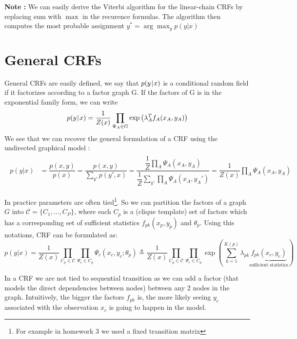 \documentclass[a4paper, 11pt]{article}
\newenvironment{note}
{\begin{framed} \textbf{Note :}}
{\end{framed}}
\newcommand{\pcond}[2]{p(#1 \hspace{-.2em}\mid\hspace{-.2em} #2)}
\begin{document}
\begin{note}
  We can easily derive the Viterbi algorithm for the linear-chain CRFs
  by replacing sum with $\max$ in the recurence formulas. The
  algorithm then computes the most probable assignment
  $y^* = \arg \max_{y} p(y|x)$
\end{note}

\section{General CRFs}

General CRFs are easily defined, we say that $\pcond{y}{x}$ is a
conditional random field if it factorizes according to a factor graph
G. If the factors of G is in the exponential family form, we can write
\begin{equation}
  \pcond{y}{x} = \dfrac{1}{Z(x)} \prod_{\Psi_A \in G} \exp{
    \left(
      \lambda_A^T f_A(x_A, y_A)
    \right)}
\end{equation}
We see that we can recover the general formulation of a CRF using the
undirected graphical model :
\begin{align}
\begin{split}
    p(y|x) &= \dfrac{p(x,y)}{p(x)}
    = \dfrac{p(x,y)}{\sum_{y'} p(y', x)}
    = \dfrac{\dfrac{1}{Z}\prod_{A}\Psi_A(x_A, y_A)}{\dfrac{1}{Z} \sum_{y'} \prod_{A} \Psi_A(x_A, y_A')}
    = \dfrac{1}{Z(x)}\prod\limits_{A} \Psi_A(x_A, y_A)
\end{split}
\end{align}

In practice parameters are often tied\footnote{For example in
  homework 3 we used a fixed transition matrix}. So we can
partition the factors of a graph $G$ into
$\mathcal{C} = \{C_1, \hdots, C_P\}$, where each $C_p$ is a (clique
template) set of factors which has a corresponding set of sufficient
statistics $f_{pk}(x_p, y_p)$ and $\theta_p$. Using this notations,
CRF can be formulated as:
\begin{equation}
    p(y|x) = \dfrac{1}{Z(x)}\prod\limits_{C_p \in \mathcal{C}} \prod\limits_{\Psi_c \in C_p} \Psi_c(x_c, y_c; \theta_p) \triangleq \dfrac{1}{Z(x)} \prod\limits_{C_p \in \mathcal{C}} \prod\limits_{\Psi_c \in C_p}
    \exp\left(\sum\limits_{k=1}^{K(p)} \lambda_{pk} \underbrace{f_{pk}(x_c, y_c)}_{\text{sufficient statistics}}\right)
    \label{eqgenchain}
\end{equation}

In a CRF we are not tied to sequential transition as we can add a factor (that models the direct dependencies between nodes) between any 2 nodes in the graph. Intuitively, the bigger the factors $f_{pk}$ is, the more likely seeing $y_c$ associated with the observation $x_c$ is going to happen in the model.
\end{document}
